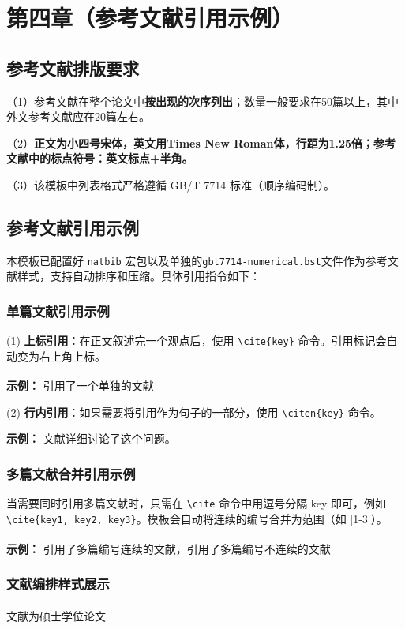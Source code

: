 \documentclass[]{WTUthesis}
\let\citen\cite
\renewcommand{\cite}[1]{\textsuperscript{\citen{#1}}}
\begin{document}
\chapter{第四章（参考文献引用示例）}

\section{参考文献排版要求}

（1）参考文献在整个论文中\textbf{按出现的次序列出}；数量一般要求在50篇以上，其中外文参考文献应在20篇左右。

（2）\textbf{正文为小四号宋体，英文用Times New Roman体，行距为1.25倍；参考文献中的标点符号：英文标点+半角。}\

（3）该模板中列表格式严格遵循 GB/T 7714 标准（顺序编码制）。

\section{参考文献引用示例}

本模板已配置好 \texttt{natbib} 宏包以及单独的\texttt{gbt7714-numerical.bst}文件作为参考文献样式，支持自动排序和压缩。具体引用指令如下：

\subsection{单篇文献引用示例}
(1) \textbf{上标引用}：在正文叙述完一个观点后，使用 \texttt{\textbackslash cite\{key\}} 命令。引用标记会自动变为右上角上标。

\textbf{示例：}
引用了一个单独的文献\cite{niu1}

(2) \textbf{行内引用}：如果需要将引用作为句子的一部分，使用 \texttt{\textbackslash citen\{key\}} 命令。

\textbf{示例：}
文献\citen{niu1}详细讨论了这个问题。

\subsection{多篇文献合并引用示例}
当需要同时引用多篇文献时，只需在 \texttt{\textbackslash cite} 命令中用逗号分隔 key 即可，例如\texttt{\textbackslash cite\{key1, key2, key3\}}。模板会自动将连续的编号合并为范围（如 [1-3]）。

\textbf{示例：}
引用了多篇编号连续的文献\cite{niu1,niu2,niu3}，引用了多篇编号不连续的文献\cite{niu1,ASPP,TPAMI2}

\subsection{文献编排样式展示}
文献\cite{niu1}为硕士学位论文
\end{document}
